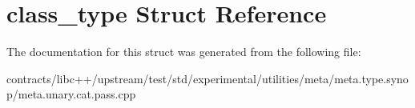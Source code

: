 \hypertarget{structclass__type}{}\section{class\+\_\+type Struct Reference}
\label{structclass__type}


The documentation for this struct was generated from the following file\+:\begin{DoxyCompactItemize}
\item 
contracts/libc++/upstream/test/std/experimental/utilities/meta/meta.\+type.\+synop/meta.\+unary.\+cat.\+pass.\+cpp\end{DoxyCompactItemize}

